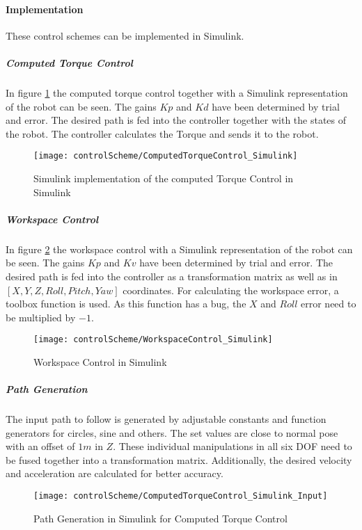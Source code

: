 \paragraph{Implementation}

These control schemes can be implemented in Simulink.  

\subparagraph{Computed Torque Control}
In figure \ref{fig:CompTorqueContr} the computed torque control together with a Simulink representation of the robot can be seen. 
The gains $Kp$ and $Kd$ have been determined by trial and error. 
The desired path is fed into the controller together with the states of the robot. The controller calculates the Torque and sends it to the robot.


\begin{figure}[H]
	\texttt{[image: controlScheme/ComputedTorqueControl\_Simulink]}
	\caption{Simulink implementation of the computed Torque Control in Simulink}
	\label{fig:CompTorqueContr}
\end{figure}



\subparagraph{Workspace Control}
In figure \ref{fig:WorkSpaceContr} the workspace control with a Simulink representation of the robot can be seen.
The gains $Kp$ and $Kv$ have been determined by trial and error.
The desired path is fed into the controller as a transformation matrix as well as in $[X,Y,Z,Roll,Pitch,Yaw]$ coordinates.
For calculating the workspace error, a toolbox function is used. As this function has a bug, the $X$ and $Roll$ error need to be multiplied by $-1$.

\begin{figure}[H]
	\texttt{[image: controlScheme/WorkspaceControl\_Simulink]}
	\caption{Workspace Control in Simulink}
	\label{fig:WorkSpaceContr}
\end{figure}


\subparagraph{Path Generation}
The input path to follow is generated by adjustable constants and function generators for circles, sine and others. 
The set values are close to normal pose with an offset of $1m$ in $Z$.
These individual manipulations in all six \ac{DOF} need to be fused together into a transformation matrix. 
Additionally, the desired velocity and acceleration are calculated for better accuracy. 

\begin{figure}[H]
	\texttt{[image: controlScheme/ComputedTorqueControl\_Simulink\_Input]}
	\caption{Path Generation in Simulink for Computed Torque Control}
	\label{fig:PathGen}
\end{figure}

